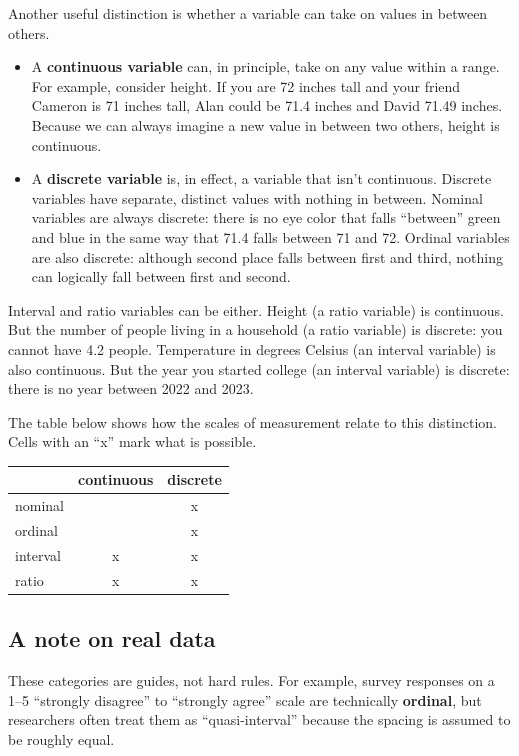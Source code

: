 \documentclass[
  letterpaper,
  DIV=11,
  numbers=noendperiod]{scrreprt}
\begin{document}
Another useful distinction is whether a variable can take on values in
between others.

\begin{itemize}
\item
  A \textbf{continuous variable} can, in principle, take on any value
  within a range. For example, consider height. If you are 72 inches
  tall and your friend Cameron is 71 inches tall, Alan could be 71.4
  inches and David 71.49 inches. Because we can always imagine a new
  value in between two others, height is continuous.
\item
  A \textbf{discrete variable} is, in effect, a variable that isn't
  continuous. Discrete variables have separate, distinct values with
  nothing in between. Nominal variables are always discrete: there is no
  eye color that falls ``between'' green and blue in the same way that
  71.4 falls between 71 and 72. Ordinal variables are also discrete:
  although second place falls between first and third, nothing can
  logically fall between first and second.
\end{itemize}

Interval and ratio variables can be either. Height (a ratio variable) is
continuous. But the number of people living in a household (a ratio
variable) is discrete: you cannot have 4.2 people. Temperature in
degrees Celsius (an interval variable) is also continuous. But the year
you started college (an interval variable) is discrete: there is no year
between 2022 and 2023.

The table below shows how the scales of measurement relate to this
distinction. Cells with an ``x'' mark what is possible.

\begin{longtable}[]{@{}lcc@{}}
\toprule\noalign{}
& continuous & discrete \\
\midrule\noalign{}
\endhead
\bottomrule\noalign{}
\endlastfoot
nominal & & x \\
ordinal & & x \\
interval & x & x \\
ratio & x & x \\
\end{longtable}

\subsection{A note on real data}\label{a-note-on-real-data}

These categories are guides, not hard rules. For example, survey
responses on a 1--5 ``strongly disagree'' to ``strongly agree'' scale
are technically \textbf{ordinal}, but researchers often treat them as
``quasi-interval'' because the spacing is assumed to be roughly equal.
\end{document}
